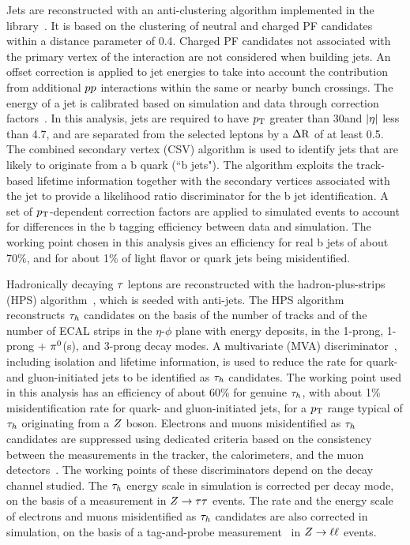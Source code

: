 Jets are reconstructed with an anti-\kt clustering algorithm implemented
in the \FASTJET library~\cite{Cacciari:2011ma, Cacciari:fastjet2}.
It is based on the clustering of neutral and charged PF candidates within a distance parameter of 0.4. Charged PF candidates
not associated with the primary vertex of the interaction
are not considered when building jets. An offset correction is applied to jet energies to take into account the contribution from additional $pp$ interactions within the same or nearby bunch crossings. The energy of a jet is calibrated based on simulation and
data through correction factors~\cite{CMS-JME-10-011}.
In this analysis, jets are required to
have $p_\mathrm{T}$ greater than 30\GeV and $\lvert\eta\rvert$ less than 4.7, and
are separated from the selected leptons by a $\Delta \mathrm{R}$ of at least 0.5.
The combined secondary vertex (CSV) algorithm is used to identify jets that are likely to originate from a b quark (``b jets"). The algorithm exploits the track-based lifetime information together with the secondary vertices associated with the jet to provide a likelihood ratio discriminator for the b jet identification. A set of $p_\mathrm{T}$-dependent correction
factors are applied to simulated events to account for differences in the b tagging efficiency
between data and simulation. The working point chosen in this analysis gives an efficiency for real b jets of about 70\%, and for about 1\% of light flavor or quark jets being misidentified.

Hadronically decaying $\tau$ leptons
are reconstructed with the hadron-plus-strips (HPS)
algorithm~\cite{Khachatryan:2015dfa, CMS-PAS-TAU-16-002}, which is
seeded with anti-\kt jets.
The HPS algorithm reconstructs $\tau_{h}$ candidates on the basis of the
number of tracks and of the number of ECAL strips in the $\eta$-$\phi$ plane with energy deposits, in the 1-prong,
1-prong + $\pi^{0}$(s), and 3-prong decay modes. A
multivariate (MVA) discriminator~\cite{Hocker:2007ht}, including isolation
and lifetime information, is used to reduce the rate for  quark- and gluon-initiated jets
to be identified as $\tau_{h}$ candidates. The working point used in this analysis
has an efficiency of about 60\% for genuine $\tau_{h}$,
with about 1\% misidentification rate for quark- and gluon-initiated jets, for a $p_\mathrm{T}$ range typical of $\tau_{h}$ originating from a $Z$ boson.
Electrons and muons misidentified as $\tau_{h}$ candidates are suppressed using dedicated criteria
based on the consistency between the measurements in the tracker, the calorimeters, and the muon detectors~\cite{Khachatryan:2015dfa, CMS-PAS-TAU-16-002}.
The working points of these discriminators depend on the
decay channel studied.
The $\tau_{h}$ energy scale in simulation is corrected per decay mode, on the basis of a measurement in $Z\to\tau\tau$ events. The rate and the
energy scale of electrons and muons misidentified as $\tau_{h}$ candidates are also corrected in simulation, on the basis of a tag-and-probe measurement~\cite{CMS:2011aa} in $Z\to\ell\ell$ events.

